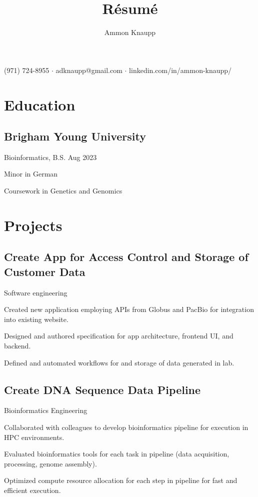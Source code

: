 \documentclass{article}
\makeatletter
\renewcommand{\maketitle}{
\begin{center}
  {\huge\bfseries\theauthor}
  \vspace{.25em}
  \par (971) 724-8955 $\cdot$ adknaupp@gmail.com $\cdot$ linkedin.com/in/ammon-knaupp/
\end{center}
}
\newcommand{\role}[1]{
    \vspace{-\baselineskip}
    \vspace{8pt}
    #1
}
\makeatother
\begin{document}
\title{R\'esum\'e}
\author{Ammon Knaupp}

\maketitle

\section{Education}

\subsection{Brigham Young University}
\role{Bioinformatics, B.S. \hfill Aug 2023}
\begin{blacksquareitemize}
    \item Minor in German
    \item Coursework in Genetics and Genomics
\end{blacksquareitemize}

\section{Projects}

\subsection{Create App for Access Control and Storage of Customer Data}
\role{Software engineering}
\begin{blacksquareitemize}
    \item Created new application employing APIs from Globus and PacBio for integration into existing website.
    \item Designed and authored specification for app architecture, frontend UI, and backend.
    \item Defined and automated workflows for and storage of data generated in lab.
\end{blacksquareitemize}

\subsection{Create DNA Sequence Data Pipeline}
\role{Bioinformatics Engineering}
\begin{blacksquareitemize}
    \item Collaborated with colleagues to develop bioinformatics pipeline for execution in HPC environments.
    \item Evaluated bioinformatics tools for each task in pipeline (data acquisition, processing, genome assembly).
    \item Optimized compute resource allocation for each step in pipeline for fast and efficient execution.
\end{blacksquareitemize}
\end{document}
